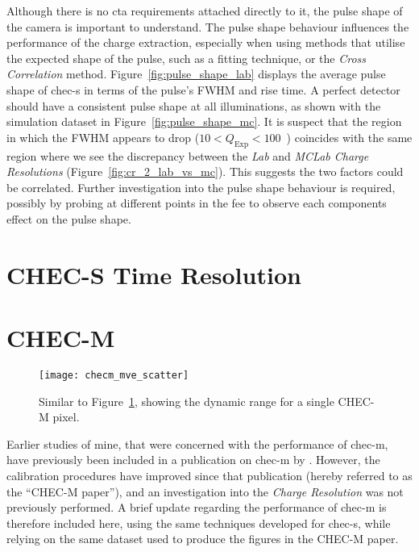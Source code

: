 Although there is no \gls{cta} requirements attached directly to it, the pulse shape of the camera is important to understand. The pulse shape behaviour influences the performance of the charge extraction, especially when using methods that utilise the expected shape of the pulse, such as a fitting technique, or the \textit{Cross Correlation} method. Figure~\ref{fig:pulse_shape_lab} displays the average pulse shape of \gls{chec-s} in terms of the pulse's FWHM and rise time. A perfect detector should have a consistent pulse shape at all illuminations, as shown with the simulation dataset in Figure~\ref{fig:pulse_shape_mc}. It is suspect that the region in which the FWHM appears to drop ($10 < Q_\text{Exp} < 100$~\si{\pe}) coincides with the same region where we see the discrepancy between the \textit{Lab} and \textit{MCLab Charge Resolutions} (Figure~\ref{fig:cr_2_lab_vs_mc}). This suggests the two factors could be correlated. Further investigation into the pulse shape behaviour is required, possibly by probing at different points in the \gls{fee} to observe each components effect on the pulse shape. 

\section{CHEC-S Time Resolution}


\section{CHEC-M}

\begin{figure}
	\centering
    \texttt{[image: checm\_mve\_scatter]} 
	\caption[CHEC-M average measured charge versus average expected charge.]{Similar to Figure~\ref{fig:checm_mve_scatter}, showing the dynamic range for a single CHEC-M pixel.}
	\label{fig:checm_mve_scatter}
\end{figure}

Earlier studies of mine, that were concerned with the performance of \gls{chec-m}, have previously been included in a publication on \gls{chec-m} by \textcite{Zorn2017}. However, the calibration procedures have improved since that publication (hereby referred to as the ``CHEC-M paper''), and an investigation into the \textit{Charge Resolution} was not previously performed. A brief update regarding the performance of \gls{chec-m} is therefore included here, using the same techniques developed for \gls{chec-s}, while relying on the same dataset used to produce the figures in the CHEC-M paper.

